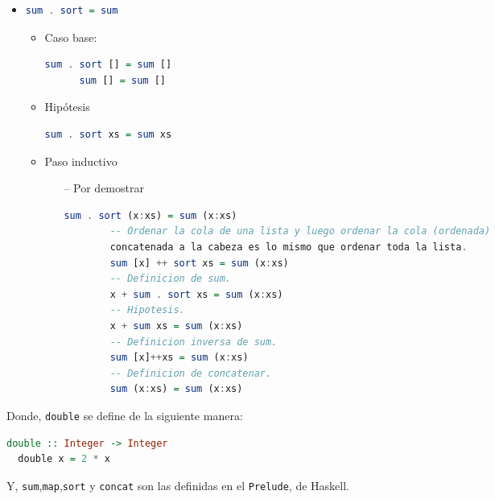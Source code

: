 \documentclass[spanish,12pt,letterpaper]{article}
\begin{document}
\begin{itemize}
\item
  \begin{lstlisting}[language=Haskell]
    sum . sort = sum
  \end{lstlisting}
  \begin{itemize}
    \item Caso base:
    \begin{lstlisting}[language=Haskell]
      sum . sort [] = sum []
      sum [] = sum []
    \end{lstlisting}
  \item Hipótesis
    \begin{lstlisting}[language=Haskell]
      sum . sort xs = sum xs
    \end{lstlisting}
  \item Paso inductivo
    \begin{itemize}
    \item [--] Por demostrar
      \begin{lstlisting}[language=Haskell]
        sum . sort (x:xs) = sum (x:xs)
        -- Ordenar la cola de una lista y luego ordenar la cola (ordenada)
        concatenada a la cabeza es lo mismo que ordenar toda la lista.
        sum [x] ++ sort xs = sum (x:xs)
        -- Definicion de sum.
        x + sum . sort xs = sum (x:xs)
        -- Hipotesis.
        x + sum xs = sum (x:xs)
        -- Definicion inversa de sum.
        sum [x]++xs = sum (x:xs)
        -- Definicion de concatenar.
        sum (x:xs) = sum (x:xs)
      \end{lstlisting}
    \end{itemize}
  \end{itemize}
  
\end{itemize}
Donde, \texttt{double} se define de la siguiente manera:
\begin{lstlisting}[language=Haskell]
  double :: Integer -> Integer
  double x = 2 * x
\end{lstlisting}
Y, \texttt{sum},\texttt{map},\texttt{sort} y \texttt{concat} son las definidas en
el \texttt{Prelude}, de Haskell.
\end{document}
